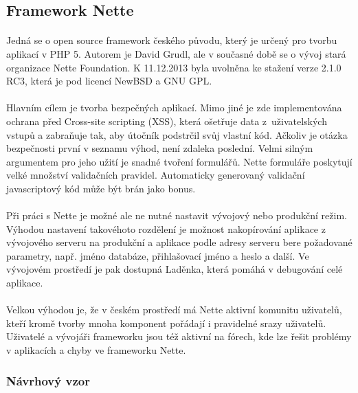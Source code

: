 \documentclass[11pt,a4paper,titlepage,oneside]{book}
\begin{document}
		\subsection{Framework Nette}
			\paragraph{} Jedná se o open source framework českého původu, který je určený pro tvorbu aplikací v PHP 5.  Autorem je David Grudl, ale v současné době se o vývoj stará organizace Nette Foundation. K 11.12.2013 byla uvolněna ke stažení verze 2.1.0 RC3, která je pod licencí NewBSD a GNU GPL.  
			\paragraph{} Hlavním cílem je tvorba bezpečných aplikací. Mimo jiné je zde implementována ochrana před Cross-site scripting (XSS), která ošetřuje data z~uživatelských vstupů a zabraňuje tak, aby útočník podstrčil svůj vlastní kód. Ačkoliv je otázka bezpečnosti první v seznamu výhod, není zdaleka poslední. Velmi silným argumentem pro jeho užití je snadné tvoření formulářů. Nette formuláře poskytují velké množství validačních pravidel. Automaticky generovaný validační javascriptový kód může být brán jako bonus.


			\paragraph{} Při práci s Nette je možné ale ne nutné nastavit vývojový nebo produkční režim. Výhodou nastavení takovéhoto rozdělení je možnost nakopírování aplikace z vývojového serveru na produkční a aplikace podle adresy serveru bere požadované parametry, např. jméno databáze, přihlašovací jméno a  heslo a další. Ve vývojovém prostředí je pak dostupná Laděnka, která pomáhá v debugování celé aplikace.
			\paragraph{} Velkou výhodou je, že v českém prostředí má Nette aktivní komunitu uživatelů, kteří kromě tvorby mnoha komponent pořádají i pravidelné srazy uživatelů.  Uživatelé a vývojáři frameworku jsou též aktivní na fórech, kde lze řešit problémy v aplikacích a chyby ve frameworku Nette.
			\subsubsection*{Návrhový vzor}
\end{document}
